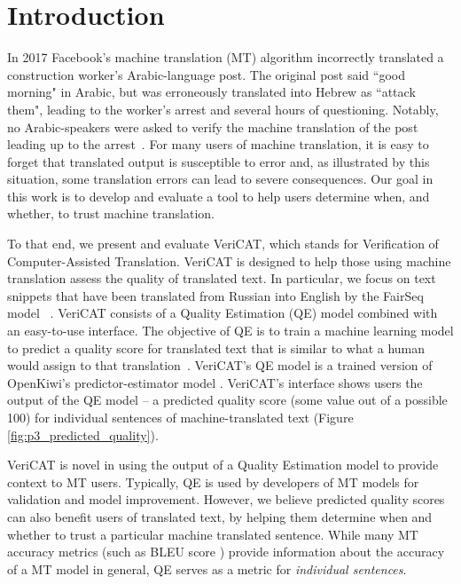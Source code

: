 \section{Introduction}

In 2017 Facebook's machine translation (MT) algorithm incorrectly translated a construction worker's Arabic-language post. The original post said ``good morning" in Arabic, but was erroneously translated into Hebrew as ``attack them", leading to the worker's arrest and several hours of questioning. Notably, no Arabic-speakers were asked to verify the machine translation of the post leading up to the arrest~\cite{hernFacebook2017}. For many users of machine translation, it is easy to forget that translated output is susceptible to error and, as illustrated by this situation, some translation errors can lead to severe consequences.
Our goal in this work is to develop and evaluate a tool to help users determine when, and whether, to trust machine translation. 

To that end, we present and evaluate VeriCAT, which stands for Verification of Computer-Assisted Translation. VeriCAT is designed to help those using machine translation assess the quality of translated text. In particular, we focus on text snippets that have been translated from Russian into English by the FairSeq model ~\cite{ott-etal-2019-fairseq}. 
VeriCAT consists of a Quality Estimation (QE) model combined with an easy-to-use interface. The objective of QE is to train a machine learning model to predict a quality score for translated text that is similar to what a human would assign to that translation~\cite{mauvcec2019machine}. VeriCAT's QE model is a trained version of OpenKiwi’s predictor-estimator model \cite{Kim2017PredictorEstimatorUM}. VeriCAT's interface shows users the output of the QE model -- a predicted quality score (some value out of a possible 100) for individual sentences of machine-translated text (Figure \ref{fig:p3_predicted_quality}).

VeriCAT is novel in using the output of a Quality Estimation model to provide context to MT users. Typically, QE is used by developers of MT models for validation and model improvement. However, we believe predicted quality scores can also benefit users of translated text, by helping them determine when and whether to trust a particular machine translated sentence. While many MT accuracy metrics (such as BLEU score \cite{papineni-etal-2002-bleu}) provide information about the accuracy of a MT model in general, QE serves as a metric for \textit{individual sentences}. 
 
